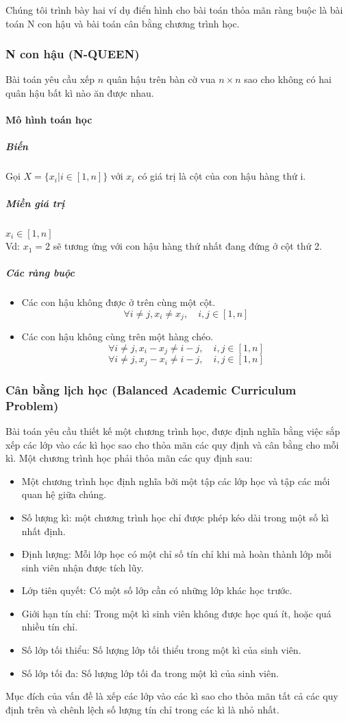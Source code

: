\documentclass[a4paper,12pt]{report}
\begin{document}
Chúng tôi trình bày hai ví dụ điển hình cho bài toán thỏa mãn ràng buộc là bài toán N con hậu và bài toán cân bằng chương trình học.
\subsubsection{N con hậu (N-QUEEN)}
Bài toán yêu cầu xếp $n$ quân hậu trên bàn cờ vua $n\times n$ sao cho không có hai quân hậu bất kì nào ăn được nhau.

\paragraph{Mô hình toán học}
\subparagraph{Biến}
Gọi $X=\{x_i|i \in [1,n]\}$ với $x_i$ có giá trị là cột của con hậu hàng thứ i.
\subparagraph{Miền giá trị}
$x_i \in [1,n]$\\
 Vd:  $x_1=2$ sẽ tương ứng với con hậu hàng thứ nhất đang đứng ở cột thứ 2.
\subparagraph{Các ràng buộc}
\begin{itemize}
\item Các con hậu không được ở trên cùng một cột.
$$ \forall i \neq j,x_i \neq x_j,  \quad i,j \in [1,n] $$
\item Các con hậu không cùng trên một hàng chéo.
$$\forall i \neq j,x_i-x_j \neq i-j , \quad i,j \in [1,n]$$
$$\forall i \neq j,x_j-x_i \neq i-j, \quad i,j \in [1,n]$$
\end{itemize} 
\subsubsection{Cân bằng lịch học (Balanced Academic Curriculum Problem) }
Bài toán yêu cầu thiết kế một chương trình học, được định nghĩa bằng việc sắp xếp các lớp vào các kì học sao cho thỏa mãn các quy định và cân bằng cho mỗi kì. Một chương trình học phải thỏa mãn các quy định sau:
\begin{itemize}
\item Một chương trình học định nghĩa bởi một tập các lớp học và tập các mối quan hệ giữa chúng.
\item Số lượng kì: một chương trình học chỉ được phép kéo dài trong một số kì nhất định.
\item Định lượng: Mỗi lớp học có một chỉ số tín chỉ khi mà hoàn thành lớp mỗi sinh viên nhận được tích lũy.
\item Lớp tiên quyết: Có một số lớp cần có những lớp khác học trước.
\item Giới hạn tín chỉ: Trong một kì sinh viên không được học quá ít, hoặc quá nhiều tín chỉ.
\item Số lớp tối thiểu: Số lượng lớp tối thiểu trong một kì của sinh viên.
\item Số lớp tối đa: Số lượng lớp tối đa trong một kì của sinh viên.
\end{itemize}
Mục đích của vấn đề là xếp các lớp vào các kì sao cho thỏa mãn tất cả các quy định trên và  chênh lệch số lượng tín chỉ trong các kì là nhỏ nhất.\cite{csplib30}
\end{document}
